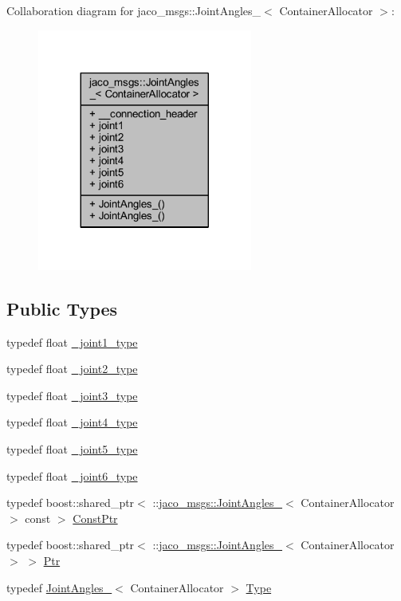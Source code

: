 Collaboration diagram for jaco\+\_\+msgs\+:\+:Joint\+Angles\+\_\+$<$ Container\+Allocator $>$\+:
\nopagebreak
\begin{figure}[H]
\begin{center}
\leavevmode
\includegraphics[width=200pt]{da/d29/structjaco__msgs_1_1JointAngles____coll__graph}
\end{center}
\end{figure}
\subsection*{Public Types}
\begin{DoxyCompactItemize}
\item 
typedef float \hyperlink{structjaco__msgs_1_1JointAngles___ad68900048ed8b91940a224d1c39a1b0d}{\+\_\+joint1\+\_\+type}
\item 
typedef float \hyperlink{structjaco__msgs_1_1JointAngles___a7908a1dd9bd0a8b94bfaccdb54237faa}{\+\_\+joint2\+\_\+type}
\item 
typedef float \hyperlink{structjaco__msgs_1_1JointAngles___a3ebebbb479a12b31cef37c2dee41d20b}{\+\_\+joint3\+\_\+type}
\item 
typedef float \hyperlink{structjaco__msgs_1_1JointAngles___a4d55cf2b8660d9ab7896de50664b9ee1}{\+\_\+joint4\+\_\+type}
\item 
typedef float \hyperlink{structjaco__msgs_1_1JointAngles___ab4d7a4bc19b5a6d132666a21273df1ae}{\+\_\+joint5\+\_\+type}
\item 
typedef float \hyperlink{structjaco__msgs_1_1JointAngles___a298f6a826b48509fa922df955db3ac71}{\+\_\+joint6\+\_\+type}
\item 
typedef boost\+::shared\+\_\+ptr$<$ \+::\hyperlink{structjaco__msgs_1_1JointAngles__}{jaco\+\_\+msgs\+::\+Joint\+Angles\+\_\+}$<$ Container\+Allocator $>$ const  $>$ \hyperlink{structjaco__msgs_1_1JointAngles___a99a33fd1ec8ee206d19e905a8ffe989a}{Const\+Ptr}
\item 
typedef boost\+::shared\+\_\+ptr$<$ \+::\hyperlink{structjaco__msgs_1_1JointAngles__}{jaco\+\_\+msgs\+::\+Joint\+Angles\+\_\+}$<$ Container\+Allocator $>$ $>$ \hyperlink{structjaco__msgs_1_1JointAngles___a86d65786f9f73c0a62b47c104f6b9fa9}{Ptr}
\item 
typedef \hyperlink{structjaco__msgs_1_1JointAngles__}{Joint\+Angles\+\_\+}$<$ Container\+Allocator $>$ \hyperlink{structjaco__msgs_1_1JointAngles___a241d45fab0d4a6249e3ab293288ad9e8}{Type}
\end{DoxyCompactItemize}
